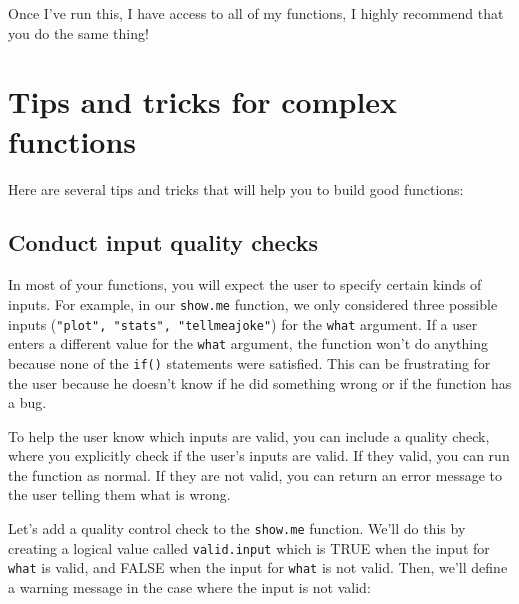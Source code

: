 \documentclass{tufte-book}\usepackage[]{graphicx}\usepackage[]{color}
\begin{document}
Once I've run this, I have access to all of my functions, I highly recommend that you do the same thing!


\section{Tips and tricks for complex functions}

Here are several tips and tricks that will help you to build good functions:

\subsection{Conduct input quality checks}

In most of your functions, you will expect the user to specify certain kinds of inputs. For example, in our \texttt{show.me} function, we only considered three possible inputs (\texttt{"plot", "stats", "tellmeajoke"}) for the \texttt{what} argument. If a user enters a different value for the \texttt{what} argument, the function won't do anything because none of the \texttt{if()} statements were satisfied. This can be frustrating for the user because he doesn't know if he did something wrong or if the function has a bug.

To help the user know which inputs are valid, you can include a quality check, where you explicitly check if the user's inputs are valid. If they valid, you can run the function as normal. If they are not valid, you can return an error message to the user telling them what is wrong.

Let's add a quality control check to the \texttt{show.me} function. We'll do this by creating a logical value called \texttt{valid.input} which is TRUE when the input for \texttt{what} is valid, and FALSE when the input for \texttt{what} is not valid. Then, we'll define a warning message in the case where the input is not valid:
\end{document}
